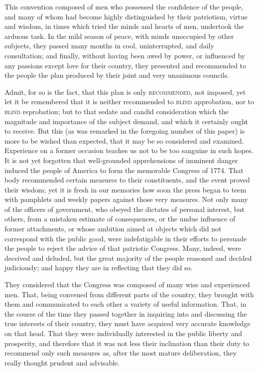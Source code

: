 This convention composed of men who possessed the confidence of the people, and many of whom had become highly distinguished by their patriotism, virtue and wisdom, in times which tried the minds and hearts of men, undertook the arduous task. In the mild season of peace, with minds unoccupied by other subjects, they passed many months in cool, uninterrupted, and daily consultation; and finally, without having been awed by power, or influenced by any passions except love for their country, they presented and recommended to the people the plan produced by their joint and very unanimous councils.

Admit, for so is the fact, that this plan is only \textsc{recommended}, not imposed, yet let it be remembered that it is neither recommended to \textsc{blind} approbation, nor to \textsc{blind} reprobation; but to that sedate and candid consideration which the magnitude and importance of the subject demand, and which it certainly ought to receive. But this (as was remarked in the foregoing number of this paper) is more to be wished than expected, that it may be so considered and examined. Experience on a former occasion teaches us not to be too sanguine in such hopes. It is not yet forgotten that well-grounded apprehensions of imminent danger induced the people of America to form the memorable Congress of 1774. That body recommended certain measures to their constituents, and the event proved their wisdom; yet it is fresh in our memories how soon the press began to teem with pamphlets and weekly papers against those very measures. Not only many of the officers of government, who obeyed the dictates of personal interest, but others, from a mistaken estimate of consequences, or the undue influence of former attachments, or whose ambition aimed at objects which did not correspond with the public good, were indefatigable in their efforts to persuade the people to reject the advice of that patriotic Congress. Many, indeed, were deceived and deluded, but the great majority of the people reasoned and decided judiciously; and happy they are in reflecting that they did so.

They considered that the Congress was composed of many wise and experienced men. That, being convened from different parts of the country, they brought with them and communicated to each other a variety of useful information. That, in the course of the time they passed together in inquiring into and discussing the true interests of their country, they must have acquired very accurate knowledge on that head. That they were individually interested in the public liberty and prosperity, and therefore that it was not less their inclination than their duty to recommend only such measures as, after the most mature deliberation, they really thought prudent and advisable.

